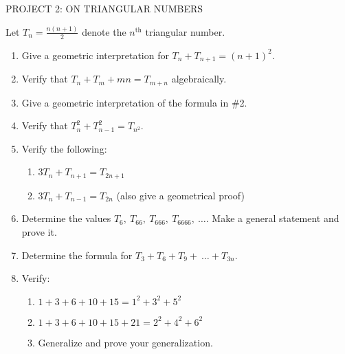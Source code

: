 PROJECT 2: ON TRIANGULAR NUMBERS

Let \(T_{n} = \frac{n\left( n + 1 \right)}{2}\) denote the
\(n^{\text{th}}\) triangular number.
\begin{enumerate}
\def\labelenumi{\arabic{enumi}.}

\item
  Give a geometric interpretation for
  \(T_{n} + T_{n + 1} = \left( n + 1 \right)^{2}.\)
\item
  Verify that \(T_{n} + T_{m} + mn = T_{m + n}\) algebraically.
\item
  Give a geometric interpretation of the formula in \#2.
\item
  Verify that \(T_{n}^{2} + T_{n - 1}^{2} = T_{n^{2}}\).
\item
  Verify the following:
\begin{enumerate}
  \def\labelenumii{\alph{enumii}.}

  \item
    \(3T_{n} + T_{n + 1} = T_{2n + 1}\)
  \item
    \(3T_{n} + T_{n - 1} = T_{2n}\) (also give a geometrical proof)

\end{enumerate}
\item
  Determine the values \(T_{6},\ T_{66},\ T_{666},\ T_{6666},\ \ldots\).
  Make a general statement and prove it.
\item
  Determine the formula for
  \(T_{3} + T_{6} + T_{9} + \ \ldots + T_{3n}.\)
\item
  Verify:
\begin{enumerate}
  \def\labelenumii{\alph{enumii}.}

  \item
    \(1 + 3 + 6 + 10 + 15 = 1^{2} + 3^{2} + 5^{2}\)
  \item
    \(1 + 3 + 6 + 10 + 15 + 21 = 2^{2} + 4^{2} + 6^{2}\)
  \item
    Generalize and prove your generalization.

\end{enumerate}

\end{enumerate}

